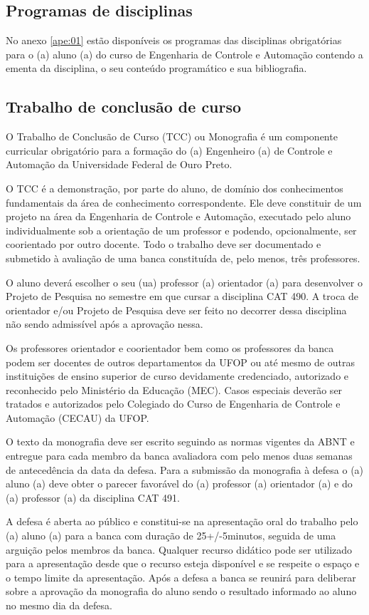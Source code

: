 \subsection*{Programas de disciplinas}
No anexo \ref{ape:01} estão disponíveis os programas das disciplinas obrigatórias para o (a) aluno (a) do curso de Engenharia de Controle e Automação contendo a ementa da disciplina, o seu conteúdo programático e sua bibliografia. 

\subsection*{Trabalho de conclusão de curso}
O Trabalho de Conclusão de Curso (TCC) ou Monografia é um componente curricular obrigatório para a formação do (a) Engenheiro (a) de Controle e Automação da Universidade Federal de Ouro Preto. 

O TCC é a demonstração, por parte do aluno, de domínio dos conhecimentos fundamentais da área de conhecimento correspondente. Ele deve constituir de um projeto na área da Engenharia de Controle e Automação, executado pelo aluno individualmente sob a orientação de um professor e podendo, opcionalmente, ser coorientado por outro docente. Todo o trabalho deve ser documentado e submetido à avaliação de uma banca constituída de, pelo menos, três professores. 

O aluno deverá escolher o seu (ua) professor (a) orientador (a) para desenvolver o Projeto de Pesquisa no semestre em que cursar a disciplina CAT 490. A troca de orientador e/ou Projeto de Pesquisa deve ser feito no decorrer dessa disciplina não sendo admissível após a aprovação nessa.

Os professores orientador e coorientador bem como os professores da banca podem ser docentes de outros departamentos da UFOP ou até mesmo de outras instituições de ensino superior de curso devidamente credenciado, autorizado e reconhecido pelo Ministério da Educação (MEC). Casos especiais deverão ser tratados e autorizados pelo Colegiado do Curso de Engenharia de Controle e Automação (CECAU) da UFOP. 

O texto da monografia deve ser escrito seguindo as normas vigentes da ABNT e entregue para cada membro da banca avaliadora com pelo menos duas semanas de antecedência da data da defesa. Para a submissão da monografia à defesa o (a) aluno (a) deve obter o parecer favorável do (a) professor (a) orientador (a) e do (a) professor (a) da disciplina CAT 491.

A defesa é aberta ao público e constitui-se na apresentação oral do trabalho pelo (a) aluno (a) para a banca com duração de 25+/-5minutos, seguida de uma arguição pelos membros da banca. Qualquer recurso didático pode ser utilizado para a apresentação desde que o recurso esteja disponível e se respeite o espaço e o tempo limite da apresentação. Após a defesa a banca se reunirá para deliberar sobre a aprovação da monografia do aluno sendo o resultado informado ao aluno no mesmo dia da defesa. 

